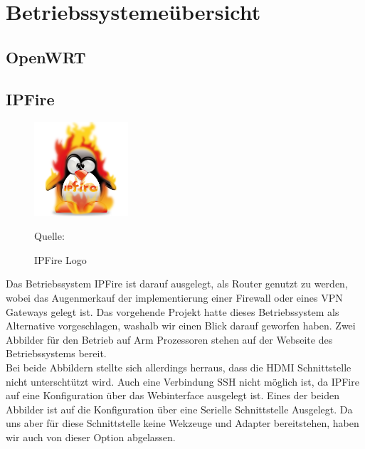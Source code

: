 \chapter{Betriebssysteme\"ubersicht}

\section{OpenWRT}

\section{IPFire}
\begin{figure}
\centering
\includegraphics[width=3.5cm]{pictures/Jakob/IPFire}
\caption{IPFire Logo}
Quelle: \cite{fire1}
\end{figure}
Das Betriebssystem IPFire ist darauf ausgelegt, als Router genutzt zu werden, wobei das Augenmerkauf der implementierung einer Firewall oder eines VPN Gateways gelegt ist.
Das vorgehende Projekt hatte dieses Betriebssystem als Alternative vorgeschlagen, washalb wir einen Blick darauf geworfen haben. Zwei Abbilder für den Betrieb auf Arm Prozessoren stehen auf der Webseite des Betriebssystems bereit. \cite{fire} \\
Bei beide Abbildern stellte sich allerdings herraus, dass die HDMI Schnittstelle nicht unterschtützt wird.
Auch eine Verbindung SSH nicht möglich ist, da IPFire auf eine Konfiguration über das Webinterface ausgelegt ist.
Eines der beiden Abbilder ist auf die Konfiguration über eine Serielle Schnittstelle Ausgelegt. Da uns aber für diese Schnittstelle keine Wekzeuge und Adapter bereitstehen, haben wir auch von dieser Option abgelassen.\\

\newpage
